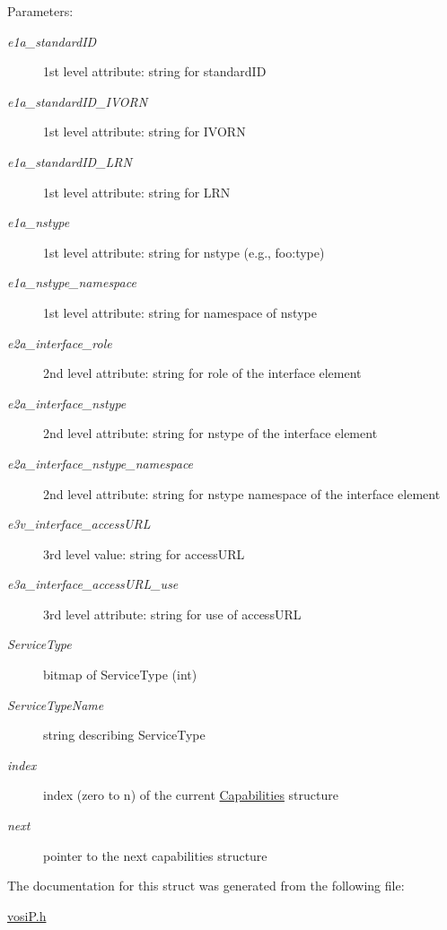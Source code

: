 \begin{Desc}
\item[Parameters:]
\begin{description}
\item[{\em e1a\_\-standardID}]1st level attribute: string for standardID \item[{\em e1a\_\-standardID\_\-IVORN}]1st level attribute: string for IVORN \item[{\em e1a\_\-standardID\_\-LRN}]1st level attribute: string for LRN \item[{\em e1a\_\-nstype}]1st level attribute: string for nstype (e.g., foo:type) \item[{\em e1a\_\-nstype\_\-namespace}]1st level attribute: string for namespace of nstype \item[{\em e2a\_\-interface\_\-role}]2nd level attribute: string for role of the interface element \item[{\em e2a\_\-interface\_\-nstype}]2nd level attribute: string for nstype of the interface element \item[{\em e2a\_\-interface\_\-nstype\_\-namespace}]2nd level attribute: string for nstype namespace of the interface element \item[{\em e3v\_\-interface\_\-accessURL}]3rd level value: string for accessURL \item[{\em e3a\_\-interface\_\-accessURL\_\-use}]3rd level attribute: string for use of accessURL \item[{\em ServiceType}]bitmap of ServiceType (int) \item[{\em ServiceTypeName}]string describing ServiceType \item[{\em index}]index (zero to n) of the current \hyperlink{structCapabilities}{Capabilities} structure \item[{\em next}]pointer to the next capabilities structure \end{description}
\end{Desc}


The documentation for this struct was generated from the following file:\begin{CompactItemize}
\item 
\hyperlink{vosiP_8h}{vosiP.h}\end{CompactItemize}
